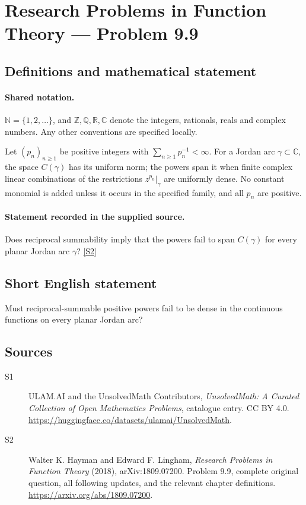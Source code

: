 \documentclass[11pt]{book}
\newcommand{\sref}[2]{\hyperlink{source:#1:#2}{[S#2]}}
\begin{document}
\section{Research Problems in Function Theory — Problem 9.9}\label{statement}

\subsection{Definitions and mathematical statement}

\paragraph{Shared notation.}$\mathbb N=\{1,2,\ldots\}$, and $\mathbb Z,\mathbb Q,\mathbb R,\mathbb C$ denote the integers, rationals, reals and complex numbers. Any other conventions are specified locally.


Let $(p_n)_{n\ge1}$ be positive integers with $\sum_{n\ge1}p_n^{-1}<\infty$. For a Jordan arc $\gamma\subset\mathbb C$, the space $C(\gamma)$ has its uniform norm; the powers span it when finite complex linear combinations of the restrictions $z^{p_n}|_\gamma$ are uniformly dense. No constant monomial is added unless it occurs in the specified family, and all $p_n$ are positive.
\paragraph{Statement recorded in the supplied source.}
Does reciprocal summability imply that the powers fail to span $C(\gamma)$ for every planar Jordan arc $\gamma$? \sref{statement}{2}
\subsection{Short English statement}
Must reciprocal-summable positive powers fail to be dense in the continuous functions on every planar Jordan arc?
\subsection{Sources}
\begin{description}
\item[\hypertarget{source:statement:1}{S1}] ULAM.AI and the UnsolvedMath Contributors, \emph{UnsolvedMath: A Curated Collection of Open Mathematics Problems}, catalogue entry. CC BY 4.0. \url{https://huggingface.co/datasets/ulamai/UnsolvedMath}.
\item[\hypertarget{source:statement:2}{S2}] Walter K. Hayman and Edward F. Lingham, \emph{Research Problems in Function Theory} (2018), arXiv:1809.07200. Problem 9.9, complete original question, all following updates, and the relevant chapter definitions. \url{https://arxiv.org/abs/1809.07200}.
\end{description}
\label{end:statement}
\end{document}
